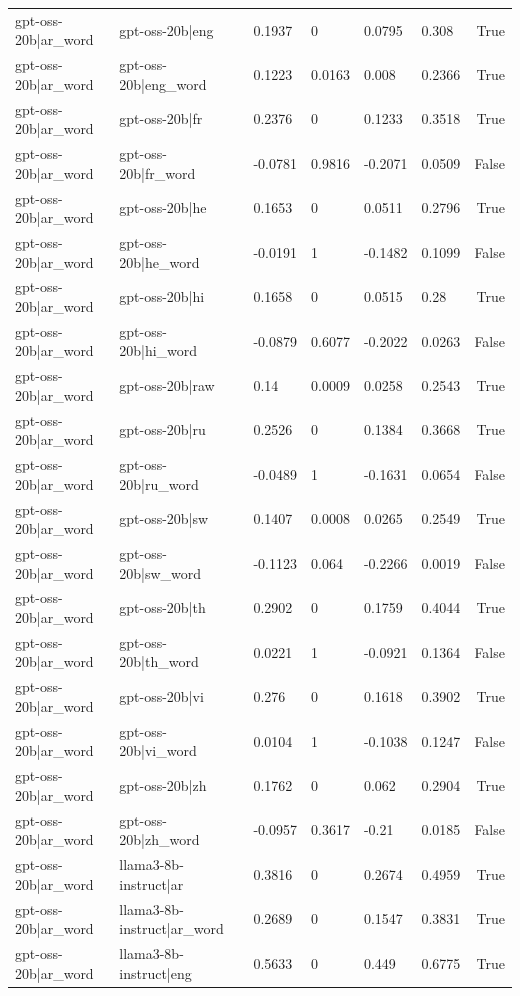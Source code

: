 \begin{table}
\begin{tabular}{llllllr}
gpt-oss-20b|ar_word & gpt-oss-20b|eng & 0.1937 & 0 & 0.0795 & 0.308 & True \\
gpt-oss-20b|ar_word & gpt-oss-20b|eng_word & 0.1223 & 0.0163 & 0.008 & 0.2366 & True \\
gpt-oss-20b|ar_word & gpt-oss-20b|fr & 0.2376 & 0 & 0.1233 & 0.3518 & True \\
gpt-oss-20b|ar_word & gpt-oss-20b|fr_word & -0.0781 & 0.9816 & -0.2071 & 0.0509 & False \\
gpt-oss-20b|ar_word & gpt-oss-20b|he & 0.1653 & 0 & 0.0511 & 0.2796 & True \\
gpt-oss-20b|ar_word & gpt-oss-20b|he_word & -0.0191 & 1 & -0.1482 & 0.1099 & False \\
gpt-oss-20b|ar_word & gpt-oss-20b|hi & 0.1658 & 0 & 0.0515 & 0.28 & True \\
gpt-oss-20b|ar_word & gpt-oss-20b|hi_word & -0.0879 & 0.6077 & -0.2022 & 0.0263 & False \\
gpt-oss-20b|ar_word & gpt-oss-20b|raw & 0.14 & 0.0009 & 0.0258 & 0.2543 & True \\
gpt-oss-20b|ar_word & gpt-oss-20b|ru & 0.2526 & 0 & 0.1384 & 0.3668 & True \\
gpt-oss-20b|ar_word & gpt-oss-20b|ru_word & -0.0489 & 1 & -0.1631 & 0.0654 & False \\
gpt-oss-20b|ar_word & gpt-oss-20b|sw & 0.1407 & 0.0008 & 0.0265 & 0.2549 & True \\
gpt-oss-20b|ar_word & gpt-oss-20b|sw_word & -0.1123 & 0.064 & -0.2266 & 0.0019 & False \\
gpt-oss-20b|ar_word & gpt-oss-20b|th & 0.2902 & 0 & 0.1759 & 0.4044 & True \\
gpt-oss-20b|ar_word & gpt-oss-20b|th_word & 0.0221 & 1 & -0.0921 & 0.1364 & False \\
gpt-oss-20b|ar_word & gpt-oss-20b|vi & 0.276 & 0 & 0.1618 & 0.3902 & True \\
gpt-oss-20b|ar_word & gpt-oss-20b|vi_word & 0.0104 & 1 & -0.1038 & 0.1247 & False \\
gpt-oss-20b|ar_word & gpt-oss-20b|zh & 0.1762 & 0 & 0.062 & 0.2904 & True \\
gpt-oss-20b|ar_word & gpt-oss-20b|zh_word & -0.0957 & 0.3617 & -0.21 & 0.0185 & False \\
gpt-oss-20b|ar_word & llama3-8b-instruct|ar & 0.3816 & 0 & 0.2674 & 0.4959 & True \\
gpt-oss-20b|ar_word & llama3-8b-instruct|ar_word & 0.2689 & 0 & 0.1547 & 0.3831 & True \\
gpt-oss-20b|ar_word & llama3-8b-instruct|eng & 0.5633 & 0 & 0.449 & 0.6775 & True \\

\end{tabular}
\end{table}
